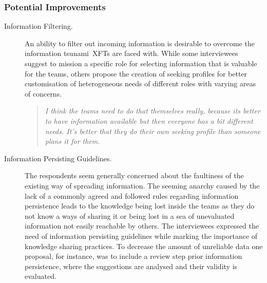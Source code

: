 \subsubsection{Potential Improvements}

\begin{description}

   \item[Information Filtering.] An ability to filter out incoming information is desirable to overcome the information tsunami~\acp{XFT} are faced with. While some interviewees suggest to mission a specific role for selecting information that is valuable for the teams, others propose the creation of seeking profiles for better customisation of heterogeneous needs of different roles with varying areas of concerns.
   
   \begin{quote}\itshape I think the teams need to do that themselves really, because its better to have information available but then everyone has a bit different needs. It's better that they do their own seeking profile than someone plans it for them.
   \end{quote}

   \item[Information Persisting Guidelines.] The respondents seem generally concerned about the faultiness of the existing way of spreading information. The seeming anarchy caused by the lack of a commonly agreed and followed rules regarding information persistence leads to the knowledge being lost inside the teams as they do not know a ways of sharing it or being lost in a sea of unevaluated information not easily reachable by others. The interviewees expressed the need of information persisting guidelines while marking the importance of knowledge sharing practices.
To decrease the amount of unreliable data one proposal, for instance, was to include a review step prior information persistence, where the suggestions are analysed and their validity is evaluated. 
   
  


\end{description}
